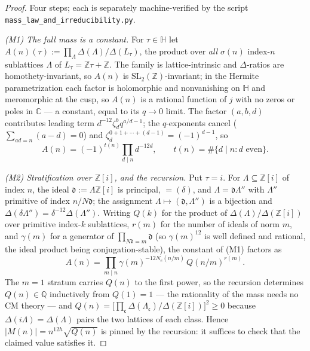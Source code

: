 \documentclass[11pt]{amsart}
\numberwithin{equation}{section}
\theoremstyle{plain}
\theoremstyle{definition}
\theoremstyle{remark}
\newcommand{\C}{\mathbb{C}}
\newcommand{\Q}{\mathbb{Q}}
\newcommand{\Z}{\mathbb{Z}}
\newcommand{\HH}{\mathbb{H}}
\newcommand{\Zi}{\Z[i]}
\newcommand{\SL}{\mathrm{SL}}
\newcommand{\idealc}{\mathfrak{c}}
\begin{document}
\begin{proof}
Four steps; each is separately machine-verified by the script
\texttt{mass\_\allowbreak law\_\allowbreak and\_\allowbreak irreducibility.py}.

\emph{(M1) The full mass is a constant.}  For $\tau \in \HH$ let
$A(n)(\tau) := \prod_{\Lambda}\Delta(\Lambda)/\Delta(L_{\tau})$, the
product over \emph{all} $\sigma(n)$ index-$n$
sublattices $\Lambda$ of $L_{\tau} = \Z\tau + \Z$.  The family is
lattice-intrinsic and $\Delta$-ratios are homothety-invariant, so
$A(n)$ is $\SL_2(\Z)$-invariant; in the Hermite parametrization each
factor is holomorphic and nonvanishing on $\HH$ and meromorphic at the
cusp, so $A(n)$ is a rational function of $j$ with no zeros or poles
in $\C$ --- a constant, equal to its $q \to 0$ limit.  The factor
$(a, b, d)$ contributes leading term $d^{-12}\zeta_d^bq^{a/d - 1}$;
the $q$-exponents cancel ($\sum_{ad = n}(a - d) = 0$) and
$\zeta_d^{0 + 1 + \cdots + (d - 1)} = (-1)^{d - 1}$, so
\[
  A(n) = (-1)^{t(n)}\prod_{d \mid n}d^{-12d},
  \qquad t(n) = \#\{d \mid n : d \text{ even}\} .
\]

\emph{(M2) Stratification over $\Zi$, and the recursion.}  Put $\tau =
i$.  For $\Lambda \subseteq \Zi$ of index $n$, the ideal $\mathfrak{d}
:= \Lambda\Zi$ is principal, $= (\delta)$, and $\Lambda =
\mathfrak{d}\Lambda''$ with $\Lambda''$ primitive of index
$n/N\mathfrak{d}$; the assignment $\Lambda \mapsto (\mathfrak{d},
\Lambda'')$ is a bijection and $\Delta(\delta\Lambda'') =
\delta^{-12}\Delta(\Lambda'')$.  Writing $Q(k)$ for the product of
$\Delta(\Lambda)/\Delta(\Zi)$ over primitive index-$k$ sublattices,
$r(m)$ for the number of ideals of norm $m$, and $\gamma(m)$ for a
generator of $\prod_{N\mathfrak{d} = m}\mathfrak{d}$ (so
$\gamma(m)^{12}$ is well defined and rational, the ideal product being
conjugation-stable), the constant of (M1) factors as
\[
  A(n) = \prod_{m \mid n}\gamma(m)^{-12N_e(n/m)}\,Q(n/m)^{r(m)} .
\]
The $m = 1$ stratum carries $Q(n)$ to the first power, so the
recursion determines $Q(n) \in \Q$ inductively from $Q(1) = 1$ ---
the rationality of the mass needs no CM theory --- and $Q(n) =
\bigl[\prod_{\idealc}\Delta(\Lambda_{\idealc})/\Delta(\Zi)\bigr]^2 \ge
0$ because $\Delta(i\Lambda) = \Delta(\Lambda)$ pairs the two lattices
of each class.  Hence $|M(n)| = n^{12h}\sqrt{Q(n)}$ is pinned by the
recursion: it suffices to check that the claimed value satisfies it.


\end{proof}
\end{document}
